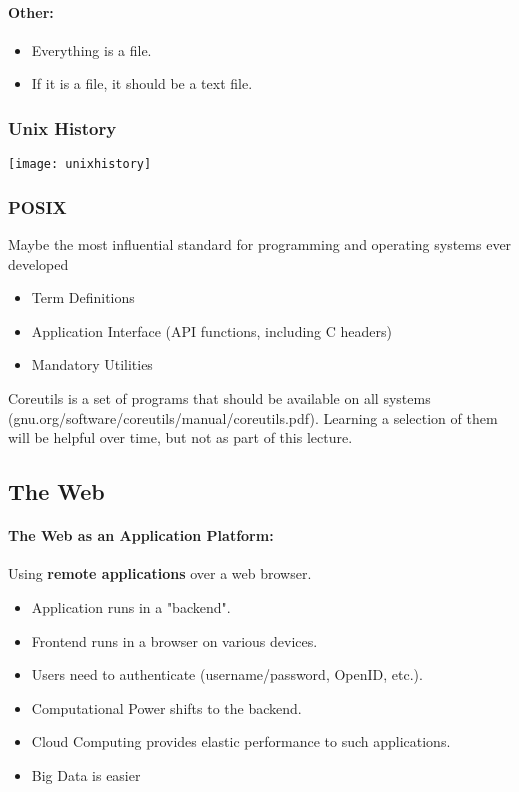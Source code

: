\documentclass[twocolumn]{article}
\begin{document}
			\paragraph{Other:}
				\begin{itemize}
				\item Everything is a file.
				\item If it is a file, it should be a text file.
				\end{itemize}
		\subsubsection{Unix History}
			\texttt{[image: unixhistory]}
		\subsubsection{POSIX}
			Maybe the most influential standard for programming and operating systems ever developed
			\begin{itemize}
			\item Term Definitions
			\item Application Interface (API functions, including C headers)
			\item Mandatory Utilities
			\end{itemize}
			Coreutils is a set of programs that should be available on all systems (gnu.org/software/coreutils/manual/coreutils.pdf). Learning a selection of them will be helpful over time, but not as part of this lecture.
	\subsection{The Web}
		\paragraph{The Web as an Application Platform:}
			Using \textbf{remote applications} over a web browser.
			\begin{itemize}
			\item Application runs in a "backend".
			\item Frontend runs in a browser on various devices.
			\item Users need to authenticate (username/password, OpenID, etc.).
			\item Computational Power shifts to the backend.
			\item Cloud Computing provides elastic performance to such applications.
			\item Big Data is easier
			\end{itemize}
\end{document}
